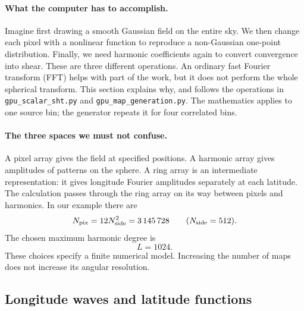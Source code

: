 \documentclass[11pt]{article}
\begin{document}
\paragraph{What the computer has to accomplish.}
Imagine first drawing a smooth Gaussian field on the entire sky. We then
change each pixel with a nonlinear function to reproduce a non-Gaussian
one-point distribution. Finally, we need harmonic coefficients again to
convert convergence into shear. These are three different operations. An
ordinary fast Fourier transform (FFT) helps with part of the work, but it
does not perform the whole spherical transform. This section explains why,
and follows the operations in \texttt{gpu\_scalar\_sht.py} and
\texttt{gpu\_map\_generation.py}. The mathematics applies to one source bin;
the generator repeats it for four correlated bins.

\paragraph{The three spaces we must not confuse.}
A pixel array gives the field at specified positions. A harmonic array
gives amplitudes of patterns on the sphere. A ring array is an intermediate
representation: it gives longitude Fourier amplitudes separately at each
latitude. The calculation passes through the ring array on its way between
pixels and harmonics. In our example there are
\begin{equation}
 N_{\rm pix}=12N_{\rm side}^{2}=3\,145\,728
 \qquad (N_{\rm side}=512).
\end{equation}
The chosen maximum harmonic degree is
\begin{equation}
 L=1024.
\end{equation}
These choices specify a finite numerical model. Increasing the number of
maps does not increase its angular resolution.

\subsection{Longitude waves and latitude functions}
\end{document}
